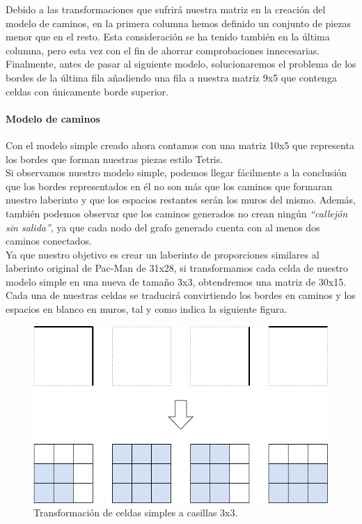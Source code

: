 Debido a las transformaciones que sufrirá nuestra matriz en la creación del modelo de caminos, en la primera columna hemos definido un conjunto de piezas menor que en el resto. Esta consideración se ha tenido también en la última columna, pero esta vez con el fin de ahorrar comprobaciones innecesarias.\\

Finalmente, antes de pasar al siguiente modelo, solucionaremos el problema de los bordes de la última fila añadiendo una fila a nuestra matriz 9x5 que contenga celdas con únicamente borde superior.

\newpage

\paragraph{Modelo de caminos}

Con el modelo simple creado ahora contamos con una matriz 10x5 que representa los bordes que forman nuestras piezas estilo Tetris.\\

Si observamos nuestro modelo simple, podemos llegar fácilmente a la conclusión que los bordes representados en él no son más que los caminos que formaran nuestro laberinto y que los espacios restantes serán los muros del mismo. Además, también podemos observar que los caminos generados no crean ningún \textit{``callejón sin salida''}, ya que cada nodo del grafo generado cuenta con al menos dos caminos conectados.\\

Ya que nuestro objetivo es crear un laberinto de proporciones similares al laberinto original de Pac-Man de 31x28, si transformamos cada celda de nuestro modelo simple en una nueva de tamaño 3x3, obtendremos una matriz de 30x15. Cada una de nuestras celdas se traducirá convirtiendo los bordes en caminos y los espacios en blanco en muros, tal y como indica la siguiente figura.\\

\begin{figure}[H]
    \begin{center}
        \includegraphics[scale=0.4]{img/celdas3x3.png}
        \caption{Transformación de celdas simples a casillas 3x3.}
    \end{center}
\end{figure}

